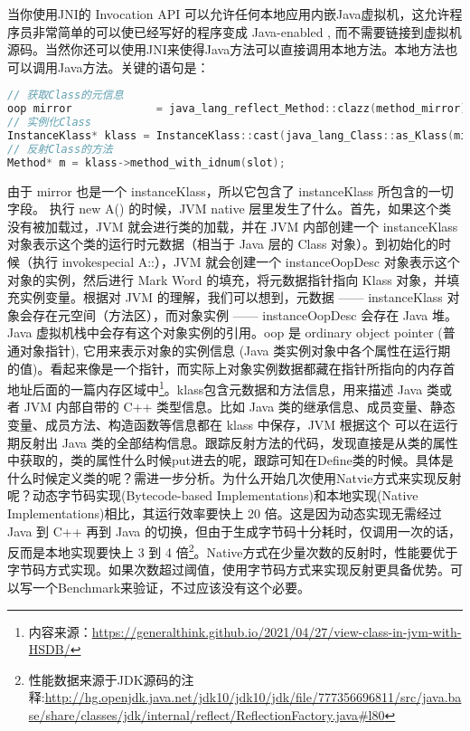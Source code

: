 \documentclass[../../../interview-questions.tex]{subfiles}
\begin{document}
当你使用JNI的 Invocation API 可以允许任何本地应用内嵌Java虚拟机，这允许程序员非常简单的可以使已经写好的程序变成 Java-enabled , 而不需要链接到虚拟机源码。当然你还可以使用JNI来使得Java方法可以直接调用本地方法。本地方法也可以调用Java方法。关键的语句是：

\begin{lstlisting}[language=C++]
// 获取Class的元信息
oop mirror             = java_lang_reflect_Method::clazz(method_mirror);
// 实例化Class
InstanceKlass* klass = InstanceKlass::cast(java_lang_Class::as_Klass(mirror));
// 反射Class的方法
Method* m = klass->method_with_idnum(slot);
\end{lstlisting}

由于 mirror 也是一个 instanceKlass，所以它包含了 instanceKlass 所包含的一切字段。
执行 new A() 的时候，JVM native 层里发生了什么。首先，如果这个类没有被加载过，JVM 就会进行类的加载，并在 JVM 内部创建一个 instanceKlass 对象表示这个类的运行时元数据（相当于 Java 层的 Class 对象）。到初始化的时候（执行 invokespecial A::），JVM 就会创建一个 instanceOopDesc 对象表示这个对象的实例，然后进行 Mark Word 的填充，将元数据指针指向 Klass 对象，并填充实例变量。根据对 JVM 的理解，我们可以想到，元数据 —— instanceKlass 对象会存在元空间（方法区），而对象实例 —— instanceOopDesc 会存在 Java 堆。Java 虚拟机栈中会存有这个对象实例的引用。oop 是 ordinary object pointer (普通对象指针), 它用来表示对象的实例信息 (Java 类实例对象中各个属性在运行期的值)。看起来像是一个指针，而实际上对象实例数据都藏在指针所指向的内存首地址后面的一篇内存区域中\footnote{内容来源：\url{https://generalthink.github.io/2021/04/27/view-class-in-jvm-with-HSDB/}}。klass包含元数据和方法信息，用来描述 Java 类或者 JVM 内部自带的 C++ 类型信息。比如 Java 类的继承信息、成员变量、静态变量、成员方法、构造函数等信息都在 klass 中保存，JVM 根据这个
可以在运行期反射出 Java 类的全部结构信息。跟踪反射方法的代码，发现直接是从类的属性中获取的，类的属性什么时候put进去的呢，跟踪可知在Define类的时候。具体是什么时候定义类的呢？需进一步分析。为什么开始几次使用Natvie方式来实现反射呢？动态字节码实现(Bytecode-based Implementations)和本地实现(Native Implementations)相比，其运行效率要快上 20 倍。这是因为动态实现无需经过 Java 到 C++ 再到 Java 的切换，但由于生成字节码十分耗时，仅调用一次的话，反而是本地实现要快上 3 到 4 倍\footnote{性能数据来源于JDK源码的注释:\url{http://hg.openjdk.java.net/jdk10/jdk10/jdk/file/777356696811/src/java.base/share/classes/jdk/internal/reflect/ReflectionFactory.java\#l80}}。Native方式在少量次数的反射时，性能要优于字节码方式实现。如果次数超过阈值，使用字节码方式来实现反射更具备优势。可以写一个Benchmark来验证，不过应该没有这个必要。
\end{document}
